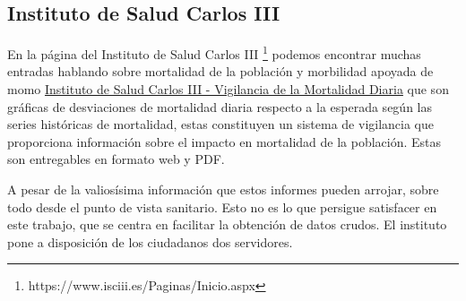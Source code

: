 \subsection{Instituto de Salud Carlos III}
En la página del Instituto de Salud Carlos III \footnote{https://www.isciii.es/Paginas/Inicio.aspx} podemos encontrar muchas entradas  hablando sobre \Gls{mortalidad} de la población y \Gls{morbilidad} apoyada de \Gls{momo} \href{https://www.isciii.es/QueHacemos/Servicios/VigilanciaSaludPublicaRENAVE/EnfermedadesTransmisibles/MoMo/Paginas/default.aspx}{Instituto de Salud Carlos III - Vigilancia de la Mortalidad Diaria} que son gráficas de desviaciones de mortalidad diaria respecto a la esperada según las series históricas de mortalidad, estas constituyen un sistema de vigilancia que proporciona información sobre el impacto en mortalidad de la población. Estas son entregables en formato web y PDF.

A pesar de la valiosísima información que estos informes pueden arrojar, sobre todo desde el punto de vista sanitario. Esto no es lo que persigue satisfacer en este trabajo, que se centra en facilitar la obtención de datos crudos. El instituto pone a disposición de los ciudadanos dos servidores.

